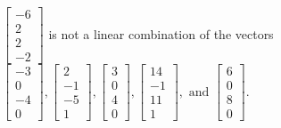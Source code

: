 \begin{exercise}
\begin{exerciseStatement}
  \end{exerciseStatement}
  \begin{exerciseAnswer}
   \(\left[\begin{array}{c}
-6 \\
2 \\
2 \\
-2
\end{array}\right]\) 
  	 is not  
	a linear combination of the vectors \(\left[\begin{array}{c}
-3 \\
0 \\
-4 \\
0
\end{array}\right] , \left[\begin{array}{c}
2 \\
-1 \\
-5 \\
1
\end{array}\right] , \left[\begin{array}{c}
3 \\
0 \\
4 \\
0
\end{array}\right] , \left[\begin{array}{c}
14 \\
-1 \\
11 \\
1
\end{array}\right] , \text{ and } \left[\begin{array}{c}
6 \\
0 \\
8 \\
0
\end{array}\right]\).

	
  


  \end{exerciseAnswer}
\end{exercise}